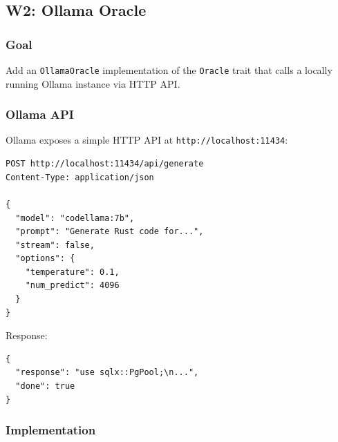 \documentclass[11pt,a4paper]{article}
\begin{document}
\subsection{W2: Ollama Oracle}
\label{sec:w2}

\subsubsection{Goal}

Add an \texttt{OllamaOracle} implementation of the \texttt{Oracle} 
trait that calls a locally running Ollama instance via HTTP API.

\subsubsection{Ollama API}

Ollama exposes a simple HTTP API at \texttt{http://localhost:11434}:

\begin{lstlisting}[style=bash]
POST http://localhost:11434/api/generate
Content-Type: application/json

{
  "model": "codellama:7b",
  "prompt": "Generate Rust code for...",
  "stream": false,
  "options": {
    "temperature": 0.1,
    "num_predict": 4096
  }
}
\end{lstlisting}

Response:
\begin{lstlisting}[style=bash]
{
  "response": "use sqlx::PgPool;\n...",
  "done": true
}
\end{lstlisting}

\subsubsection{Implementation}
\end{document}
